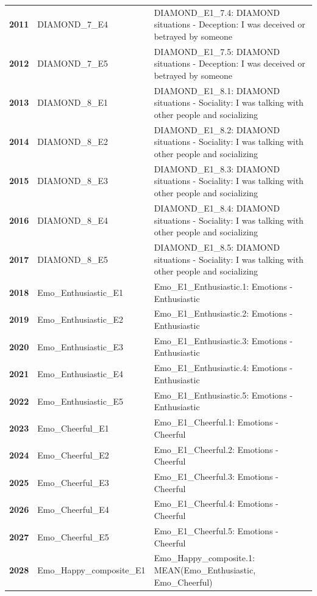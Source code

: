 \documentclass[
  letterpaper,
  DIV=11,
  numbers=noendperiod]{scrartcl}
\begin{document}
\begin{longtable}[t]{>{}cll}
\addlinespace
\textbf{2011} & DIAMOND\_7\_E4 & DIAMOND\_E1\_7.4: DIAMOND situations - Deception: I was deceived or betrayed by someone\\
\textbf{2012} & DIAMOND\_7\_E5 & DIAMOND\_E1\_7.5: DIAMOND situations - Deception: I was deceived or betrayed by someone\\
\textbf{2013} & DIAMOND\_8\_E1 & DIAMOND\_E1\_8.1: DIAMOND situations - Sociality: I was talking with other people and socializing\\
\textbf{2014} & DIAMOND\_8\_E2 & DIAMOND\_E1\_8.2: DIAMOND situations - Sociality: I was talking with other people and socializing\\
\textbf{2015} & DIAMOND\_8\_E3 & DIAMOND\_E1\_8.3: DIAMOND situations - Sociality: I was talking with other people and socializing\\
\addlinespace
\textbf{2016} & DIAMOND\_8\_E4 & DIAMOND\_E1\_8.4: DIAMOND situations - Sociality: I was talking with other people and socializing\\
\textbf{2017} & DIAMOND\_8\_E5 & DIAMOND\_E1\_8.5: DIAMOND situations - Sociality: I was talking with other people and socializing\\
\textbf{2018} & Emo\_Enthusiastic\_E1 & Emo\_E1\_Enthusiastic.1: Emotions - Enthusiastic\\
\textbf{2019} & Emo\_Enthusiastic\_E2 & Emo\_E1\_Enthusiastic.2: Emotions - Enthusiastic\\
\textbf{2020} & Emo\_Enthusiastic\_E3 & Emo\_E1\_Enthusiastic.3: Emotions - Enthusiastic\\
\addlinespace
\textbf{2021} & Emo\_Enthusiastic\_E4 & Emo\_E1\_Enthusiastic.4: Emotions - Enthusiastic\\
\textbf{2022} & Emo\_Enthusiastic\_E5 & Emo\_E1\_Enthusiastic.5: Emotions - Enthusiastic\\
\textbf{2023} & Emo\_Cheerful\_E1 & Emo\_E1\_Cheerful.1: Emotions - Cheerful\\
\textbf{2024} & Emo\_Cheerful\_E2 & Emo\_E1\_Cheerful.2: Emotions - Cheerful\\
\textbf{2025} & Emo\_Cheerful\_E3 & Emo\_E1\_Cheerful.3: Emotions - Cheerful\\
\addlinespace
\textbf{2026} & Emo\_Cheerful\_E4 & Emo\_E1\_Cheerful.4: Emotions - Cheerful\\
\textbf{2027} & Emo\_Cheerful\_E5 & Emo\_E1\_Cheerful.5: Emotions - Cheerful\\
\textbf{2028} & Emo\_Happy\_composite\_E1 & Emo\_Happy\_composite.1: MEAN(Emo\_Enthusiastic, Emo\_Cheerful)\\

\end{longtable}
\end{document}
